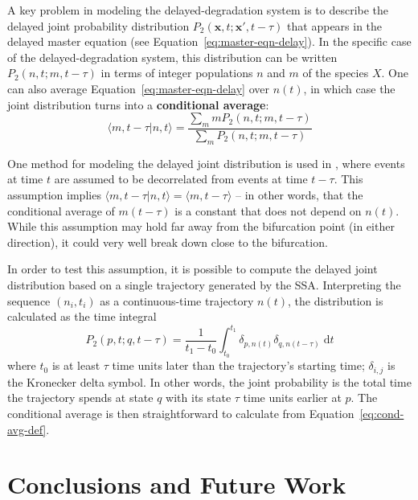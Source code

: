\documentclass[english,letterpaper,12pt]{article}
\newcommand{\defkeywd}[1]{\textbf{#1}}
\newcommand{\dee}{\;\mathrm{d}}
\renewcommand{\vec}[1]{\ensuremath{\mathbf{#1}}}
\begin{document}
\begin{doublespacing}
A key problem in modeling the delayed-degradation system is to describe the delayed joint probability distribution $P_2(\vec{x}, t; \vec{x}', t - \tau)$ that appears in the delayed master equation (see Equation~\eqref{eq:master-eqn-delay}). In the specific case of the delayed-degradation system, this distribution can be written $P_2(n, t; m, t - \tau)$ in terms of integer populations $n$ and $m$ of the species $X$. One can also average Equation~\eqref{eq:master-eqn-delay} over $n(t)$, in which case the joint distribution turns into a \defkeywd{conditional average}:
\begin{equation}
    \langle m, t - \tau | n, t \rangle = \frac{\sum_m m P_2(n, t; m, t - \tau)}{\sum_m P_2(n, t; m, t - \tau) }
    \label{eq:cond-avg-def}
\end{equation}

One method for modeling the delayed joint distribution is used in \cite{delay-oscillations}, where events at time $t$ are assumed to be decorrelated from events at time $t - \tau$. This assumption implies $\langle m, t - \tau | n, t \rangle = \langle m, t - \tau \rangle$ -- in other words, that the conditional average of $m(t - \tau)$ is a constant that does not depend on $n(t)$. While this assumption may hold far away from the bifurcation point (in either direction), it could very well break down close to the bifurcation.

In order to test this assumption, it is possible to compute the delayed joint distribution based on a single trajectory generated by the SSA. Interpreting the sequence $(n_i, t_i)$ as a continuous-time trajectory $n(t)$, the distribution is calculated as the time integral
\begin{equation}
    P_2(p, t; q, t - \tau) = \frac{1}{t_1 - t_0} \int_{t_0}^{t_1} \delta_{p, n(t)} \delta_{q, n(t - \tau)} \dee t
    \label{eq:joint-pdist-calc}
\end{equation}
where $t_0$ is at least $\tau$ time units later than the trajectory's starting time; $\delta_{i,j}$ is the Kronecker delta symbol. In other words, the joint probability is the total time the trajectory spends at state $q$ with its state $\tau$ time units earlier at $p$. The conditional average is then straightforward to calculate from Equation~\eqref{eq:cond-avg-def}.



\section{Conclusions and Future Work} %
\label{sec:conclusions}


\end{doublespacing}
\end{document}
